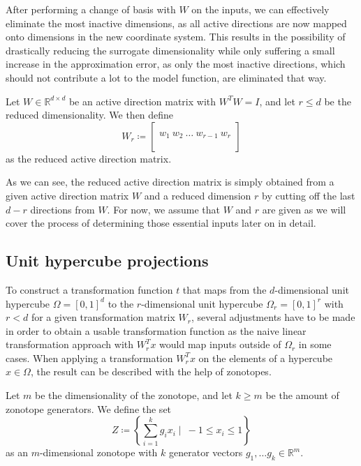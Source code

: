 \documentclass[
  a4paper,  %
  twoside,  %
  bibliography=totoc,
  headsepline,
  cleardoublepage=empty,
  parskip=half,
  draft=false
]{scrbook}
\begin{document}
After performing a change of basis with $W$ on the inputs, we can effectively eliminate the most inactive dimensions, as all active directions are now mapped onto dimensions in the new coordinate system.
This results in the possibility of drastically reducing the surrogate dimensionality while only suffering a small increase in the approximation error, as only the most inactive directions, which should not contribute a lot to the model function, are eliminated that way.

\begin{definition}
Let $W \in \mathds{R}^{d \times d}$ be an active direction matrix with $W^T W=I$, and let $r \leq d$ be the reduced dimensionality.
We then define
\begin{equation}
W_r \coloneqq \begin{bmatrix}
  \\
    w_1 ~ w_2 ~ \dots ~ w_{r-1} ~ w_r\\
    \\
  \end{bmatrix}
\end{equation}
as the reduced active direction matrix.
\end{definition}
%
As we can see, the reduced active direction matrix is simply obtained from a given active direction matrix $W$ and a reduced dimension $r$ by cutting off the last $d - r$ directions from $W$.
For now, we assume that $W$ and $r$ are given as we will cover the process of determining those essential inputs later on in detail.

\subsection{Unit hypercube projections}

To construct a transformation function $t$ that maps from the $d$-dimensional unit hypercube $\Omega=[0,1]^d$ to the $r$-dimensional unit hypercube $\Omega_r=[0,1]^r$ with $r < d$ for a given transformation matrix $W_r$, several adjustments have to be made in order to obtain a usable transformation function as the naive linear transformation approach with $W_r^T x$ would map inputs outside of $\Omega_r$ in some cases.
When applying a transformation $W_r^T x$ on the elements of a hypercube $x \in \Omega$, the result can be described with the help of zonotopes.

\begin{definition}[Zonotope]
Let $m$ be the dimensionality of the zonotope, and let $k \geq m$ be the amount of zonotope generators.
We define the set
\begin{equation}
Z \coloneqq \left\{\sum_{i=1}^k g_i x_i \mid ~ -1 \leq x_i \leq 1\right\}
  \label{zonotope}
\end{equation}
as an $m$-dimensional zonotope with $k$ generator vectors $g_1, \dots g_k \in \mathds{R}^m$.
\end{definition}
\end{document}
